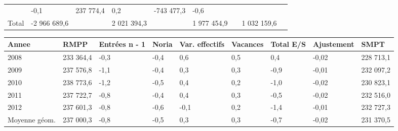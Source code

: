 \begin{longtable}[]{@{}lllllllll@{}}
\begin{minipage}[t]{0.16\columnwidth}
\end{minipage} & \begin{minipage}[t]{0.06\columnwidth}\raggedright
-0,1\strut
\end{minipage} & \begin{minipage}[t]{0.12\columnwidth}\raggedright
237 774,4\strut
\end{minipage} & \begin{minipage}[t]{0.06\columnwidth}\raggedright
0,2\strut
\end{minipage} & \begin{minipage}[t]{0.10\columnwidth}\raggedright
-743 477,3\strut
\end{minipage} & \begin{minipage}[t]{0.06\columnwidth}\raggedright
-0,6\strut
\end{minipage}\tabularnewline
\begin{minipage}[t]{0.05\columnwidth}\raggedright
Total\strut
\end{minipage} & \begin{minipage}[t]{0.10\columnwidth}\raggedright
-2 966 689,6\strut
\end{minipage} & \begin{minipage}[t]{0.06\columnwidth}\raggedright
\strut
\end{minipage} & \begin{minipage}[t]{0.16\columnwidth}\raggedright
2 021 394,3\strut
\end{minipage} & \begin{minipage}[t]{0.06\columnwidth}\raggedright
\strut
\end{minipage} & \begin{minipage}[t]{0.12\columnwidth}\raggedright
1 977 454,9\strut
\end{minipage} & \begin{minipage}[t]{0.06\columnwidth}\raggedright
\strut
\end{minipage} & \begin{minipage}[t]{0.10\columnwidth}\raggedright
1 032 159,6\strut
\end{minipage} & \begin{minipage}[t]{0.06\columnwidth}\raggedright
\strut
\end{minipage}\tabularnewline
\bottomrule
\end{longtable}

\begin{longtable}[]{@{}lllllllll@{}}
\toprule
Annee & RMPP & Entrées n - 1 & Noria & Var. effectifs & Vacances & Total
E/S & Ajustement & SMPT\tabularnewline
\midrule
\endhead
2008 & 233 364,4 & -0,3 & -0,4 & 0,6 & 0,5 & 0,4 & -0,02 & 228
713,1\tabularnewline
2009 & 237 576,8 & -1,1 & -0,4 & 0,3 & 0,3 & -0,9 & -0,01 & 232
097,2\tabularnewline
2010 & 238 773,6 & -1,2 & -0,5 & 0,4 & 0,2 & -1,0 & -0,02 & 230
823,1\tabularnewline
2011 & 237 722,7 & -0,8 & -0,4 & 0,4 & 0,3 & -0,5 & -0,02 & 232
516,0\tabularnewline
2012 & 237 601,3 & -0,8 & -0,6 & -0,1 & 0,2 & -1,4 & -0,01 & 232
727,3\tabularnewline
Moyenne géom. & 237 000,3 & -0,8 & -0,5 & 0,3 & 0,3 & -0,7 & -0,02 & 231
370,5\tabularnewline
\bottomrule
\end{longtable}

